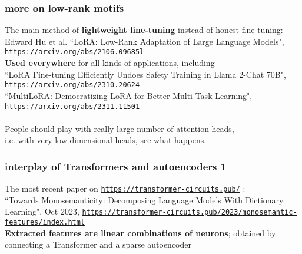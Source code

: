 \documentclass{beamer}
\begin{document}
\begin{frame}

  \frametitle{more on low-rank motifs}

The main method of {\bf lightweight fine-tuning} instead of honest fine-tuning:
Edward Hu et al. ``LoRA: Low-Rank Adaptation of Large Language Models", 
\href{https://arxiv.org/abs/2106.09685}{\tt\small https://arxiv.org/abs/2106.09685l}\\[2ex]

{\bf Used everywhere} for all kinds of applications, including\\[2ex]

``LoRA Fine-tuning Efficiently Undoes Safety Training in Llama 2-Chat 70B",
\href{https://arxiv.org/abs/2310.20624}{\tt\small https://arxiv.org/abs/2310.20624}\\[2ex]

``MultiLoRA: Democratizing LoRA for Better Multi-Task Learning",
\href{https://arxiv.org/abs/2311.11501}{\tt\small https://arxiv.org/abs/2311.11501}\\

\hrulefill\\[1ex]

People should play with really large number of attention heads,\\ i.e. with very low-dimensional heads,
see what happens.

\end{frame}


\begin{frame}

  \frametitle{interplay of Transformers and autoencoders 1}

The most recent paper on \href{https://transformer-circuits.pub/}{\tt\small https://transformer-circuits.pub/} :\\[2ex]

``Towards Monosemanticity: Decomposing Language Models With Dictionary Learning",  Oct 2023,
\href{https://transformer-circuits.pub/2023/monosemantic-features/index.html}{\tt\footnotesize https://transformer-circuits.pub/2023/monosemantic-features/index.html}\\[2ex]

{\bf Extracted features are linear combinations of neurons}; obtained by connecting a Transformer and a sparse autoencoder\\[2ex]

\end{frame}
\end{document}
